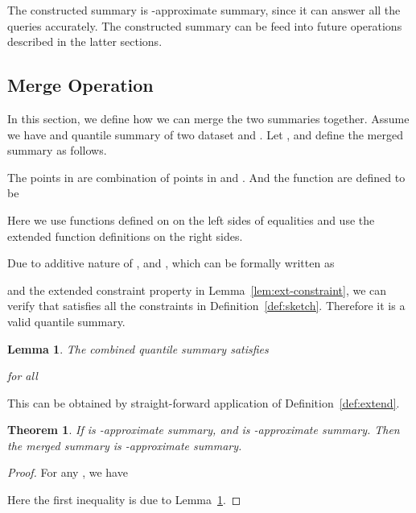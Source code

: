 \documentclass{sig-alternate-05-2015}
\newtheorem{thm:thm}{Theorem}[section]
\newtheorem{thm:lemma}{Lemma}[section]
\begin{document}
The constructed summary is -approximate summary, since it can answer all the queries accurately. The constructed summary can be feed into future operations described in the latter sections.

\subsection{Merge Operation}
In this section, we define how we can merge the two summaries together. Assume we have  and   quantile summary of two dataset  and . Let , and define the merged summary  as follows.

The points in  are combination of points in  and . And the function  are defined to be



Here we use functions defined on  on the left sides of equalities
and use the  extended function definitions on the right sides.

Due to additive nature of ,  and , which can be formally written as

and the extended constraint property in Lemma~\ref{lem:ext-constraint}, we can verify that
 satisfies all the constraints in Definition~\ref{def:sketch}. Therefore it is a valid quantile summary.

\begin{thm:lemma}\label{lem:merge-extend}
The combined quantile summary satisfies



for all 
\end{thm:lemma}
This can be obtained by straight-forward application of Definition~\ref{def:extend}.
\begin{thm:thm}
If  is -approximate summary, and   is -approximate summary. Then the merged summary  is -approximate summary.
\end{thm:thm}
\begin{proof}
For any , we have

Here the first inequality is due to Lemma~\ref{lem:merge-extend}.
\end{proof}
\end{document}
